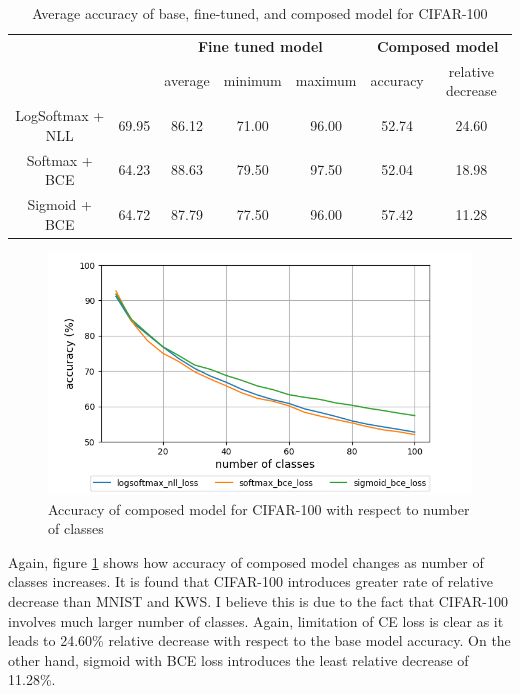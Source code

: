\documentclass{article}
\begin{document}
\begin{table}[t]
    \centering
    \begin{tabular}{ccccccc}
        \toprule[1pt]
        \multirow{2}{*}{\raisebox{-3\heavyrulewidth}{\bf Loss function}} &
        \multirow{2}{*}{\raisebox{-3\heavyrulewidth}{\bf Base model}} &
        \multicolumn{3}{c}{\bf Fine tuned model } &
        \multicolumn{2}{c}{\bf Composed model } \\
        \cmidrule(lr){3-5}
        \cmidrule(lr){6-7}
        & & average & minimum & maximum & accuracy & relative decrease \\
        \midrule
        LogSoftmax + NLL & 69.95 & 86.12 & 71.00 & 96.00 & 52.74 & 24.60 \\
        Softmax + BCE & 64.23 & 88.63 & 79.50 & 97.50 & 52.04 & 18.98 \\
        Sigmoid + BCE & 64.72 & 87.79 & 77.50 & 96.00 & 57.42 & 11.28 \\
        \bottomrule[1pt]
    \end{tabular}
    \caption{Average accuracy of base, fine-tuned, and composed model for CIFAR-100}
    \label{table:cifar}
\end{table}

\begin{figure}[t]
    \centering
    \includegraphics[scale=0.5,trim={0mm 0mm 0mm 0mm},clip]{cifar100.png}
    \caption{Accuracy of composed model for CIFAR-100 with respect to number of classes}
    \label{figure:composed_cifar}
\end{figure}

Again, figure \ref{figure:composed_cifar} shows how accuracy of composed model changes as number of classes increases. It is found that CIFAR-100 introduces greater rate of relative decrease than MNIST and KWS. I believe this is due to the fact that CIFAR-100 involves much larger number of classes. Again, limitation of CE loss is clear as it leads to 24.60\% relative decrease with respect to the base model accuracy. On the other hand, sigmoid with BCE loss introduces the least relative decrease of 11.28\%.
\end{document}
